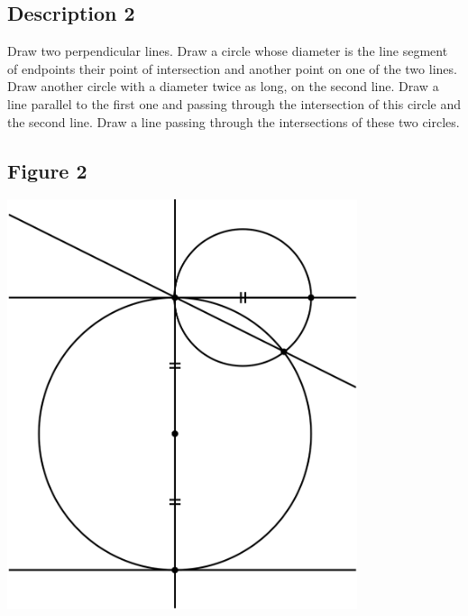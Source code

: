 \documentclass[12pt,a4paper,article,english,firamath]{nsi}
\begin{document}
\maketitle
\subsection*{Description 2}
{\brettley
Draw two perpendicular lines. Draw a circle whose diameter is the line segment of endpoints their point of intersection and another point on one of the two lines. Draw another circle with a diameter twice as long, on the second line. Draw a line parallel to the first one and passing through the intersection of this circle and the second line. Draw a line passing through the intersections of these two circles.}\\[1em]




\subsection*{Figure 2}
\begin{center}
    \includegraphics[height=12cm]{img/fig02.png}
\end{center}
\end{document}
